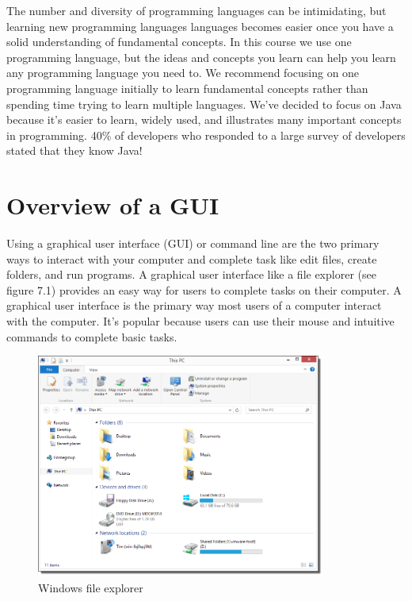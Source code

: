 The number and diversity of programming languages can be intimidating, but learning new programming languages languages becomes easier once you have a solid understanding of fundamental concepts. In this course we use one programming language, but the ideas and concepts you learn can help you learn any programming language you need to. We recommend focusing on one programming language initially to learn fundamental concepts rather than spending time trying to learn multiple languages. We’ve decided to focus on Java because it’s easier to learn, widely used, and illustrates many important concepts in programming. 40\% of developers who responded to a large survey of developers stated that they know Java! \\


\section{Overview of a GUI}
Using a graphical user interface (GUI) or command line are the two primary ways to interact with your computer and complete task like edit files, create folders, and run programs. A graphical user interface like a file explorer (see figure 7.1) provides an easy way for users to complete tasks on their computer. A graphical user interface is the primary way most users of a computer interact with the computer. It’s popular because users can use their mouse and intuitive commands to complete basic tasks. \\

\begin{figure}
	\centering
	\includegraphics[width=0.85\textwidth]{lectures/images/windowsGUI.png}
	\caption{Windows file explorer}
	\label{fig:windows:file}
\end{figure}

